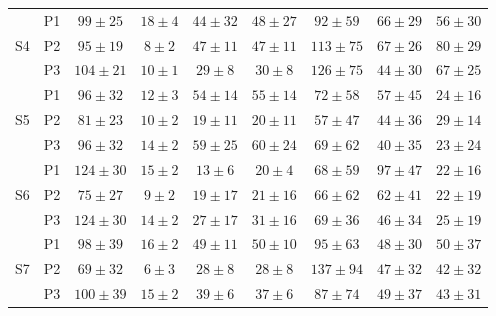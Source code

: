 \begin{table}[!ht]
{\begin{tabular}{|c|c|c||c|c|c||c|c|c|}
    \hline
    \hline
    \multirow{3}{*}{S4} & P1 & $99\pm 25$ & $18\pm 4$ & $44\pm 32$ & $48\pm 27$ & $92\pm 59$ & $66\pm 29$ & $56\pm 30$ \\
    & P2 & $95\pm 19$ & $8\pm 2$ & $47\pm 11$ & $47\pm 11$ & $113\pm 75$ & $67\pm 26$ & $80\pm 29$ \\
    & P3 & $104\pm 21$ & $10\pm 1$ & $29\pm 8$ & $30\pm 8$ & $126\pm 75$ & $44\pm 30$ & $67\pm 25$ \\
    \hline
    \hline
    \multirow{3}{*}{S5} & P1 & $96\pm 32$ & $12\pm 3$ & $54\pm 14$ & $55\pm 14$ & $72\pm 58$ & $57\pm 45$ & $24\pm 16$ \\
    & P2 & $81\pm 23$ & $10\pm 2$ & $19\pm 11$ & $20\pm 11$ & $57\pm 47$ & $44\pm 36$ & $29\pm 14$ \\
    & P3 & $96\pm 32$ & $14\pm 2$ & $59\pm 25$ & $60\pm 24$ & $69\pm 62$ & $40\pm 35$ & $23\pm 24$ \\
    \hline
    \hline
    \multirow{3}{*}{S6} & P1 & $124\pm 30$ & $15\pm 2$ & $13\pm 6$ & $20\pm 4$ & $68\pm 59$ & $97\pm 47$ & $22\pm 16$ \\
    & P2 & $75\pm 27$ & $9\pm 2$ & $19\pm 17$ & $21\pm 16$ & $66\pm 62$ & $62\pm 41$ & $22\pm 19$ \\
    & P3 & $124\pm 30$ & $14\pm 2$ & $27\pm 17$ & $31\pm 16$ & $69\pm 36$ & $46\pm 34$ & $25\pm 19$ \\
    \hline
    \hline
    \multirow{3}{*}{S7} & P1 & $98\pm 39$ & $16\pm 2$ & $49\pm 11$ & $50\pm 10$ & $95\pm 63$ & $48\pm 30$ & $50\pm 37$ \\
    & P2 & $69\pm 32$ & $6\pm 3$ & $28\pm 8$ & $28\pm 8$ & $137\pm 94$ & $47\pm 32$ & $42\pm 32$ \\
    & P3 & $100\pm 39$ & $15\pm 2$ & $39\pm 6$ & $37\pm 6$ & $87\pm 74$ & $49\pm 37$ & $43\pm 31$ \\
    \hline
    \hline

\end{tabular}}
\end{table}
